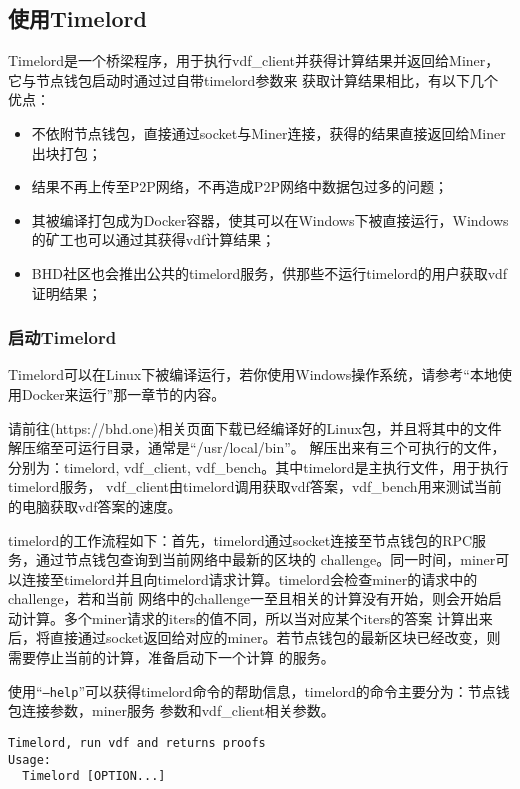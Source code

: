 \begin{flushleft}
\subsection{使用Timelord}
\begin{flushleft}
    Timelord是一个桥梁程序，用于执行vdf\_client并获得计算结果并返回给Miner，它与节点钱包启动时通过过自带timelord参数来
    获取计算结果相比，有以下几个优点：
\end{flushleft}
\begin{itemize}
    \item 不依附节点钱包，直接通过socket与Miner连接，获得的结果直接返回给Miner出块打包；
    \item 结果不再上传至P2P网络，不再造成P2P网络中数据包过多的问题；
    \item 其被编译打包成为Docker容器，使其可以在Windows下被直接运行，Windows的矿工也可以通过其获得vdf计算结果；
    \item BHD社区也会推出公共的timelord服务，供那些不运行timelord的用户获取vdf证明结果；
\end{itemize}
\subsubsection{启动Timelord}
\begin{flushleft}
    Timelord可以在Linux下被编译运行，若你使用Windows操作系统，请参考``本地使用Docker来运行''那一章节的内容。
\end{flushleft}
\begin{flushleft}
    请前往(https://bhd.one)相关页面下载已经编译好的Linux包，并且将其中的文件解压缩至可运行目录，通常是``/usr/local/bin''。
    解压出来有三个可执行的文件，分别为：timelord, vdf\_client, vdf\_bench。其中timelord是主执行文件，用于执行timelord服务，
    vdf\_client由timelord调用获取vdf答案，vdf\_bench用来测试当前的电脑获取vdf答案的速度。
\end{flushleft}
\begin{flushleft}
    timelord的工作流程如下：首先，timelord通过socket连接至节点钱包的RPC服务，通过节点钱包查询到当前网络中最新的区块的
    challenge。同一时间，miner可以连接至timelord并且向timelord请求计算。timelord会检查miner的请求中的challenge，若和当前
    网络中的challenge一至且相关的计算没有开始，则会开始启动计算。多个miner请求的iters的值不同，所以当对应某个iters的答案
    计算出来后，将直接通过socket返回给对应的miner。若节点钱包的最新区块已经改变，则需要停止当前的计算，准备启动下一个计算
    的服务。
\end{flushleft}
\begin{flushleft}
    使用``\texttt{--help}''可以获得timelord命令的帮助信息，timelord的命令主要分为：节点钱包连接参数，miner服务
    参数和vdf\_client相关参数。
\end{flushleft}
\scriptsize
\begin{verbatim}
Timelord, run vdf and returns proofs
Usage:
  Timelord [OPTION...]


\end{verbatim}
\end{flushleft}

